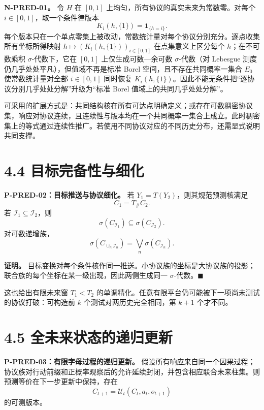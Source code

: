 \documentclass[
  11pt,
  oneside]{book}
\begin{document}
\textbf{N-PRED-01。} 令 \(H\) 在 \([0,1]\) 上均匀，所有协议的真实未来为常数零。对每个 \(i\in[0,1]\)，取一个条件律版本 \[K_i(h,\{1\})=\mathbf1_{\{h=i\}}.\] 每个版本只在一个单点零集上被改动，常数统计量对每个协议分别充分。逐点收集所有坐标所得映射 \(h\mapsto(K_i(h,\{1\}))_{i\in[0,1]}\) 在点集意义上区分每个 \(h\)；在不可数乘积 \(\sigma\)-代数下，它在 \([0,1]\) 上仅生成可数---余可数 \(\sigma\)-代数（对 Lebesgue 测度仍几乎处处平凡），但值域不再是标准 Borel 空间，且不存在共同概率一集合 \(E_0\) 使常数统计量对全部 \(i\in[0,1]\) 同时恢复 \(K_i(h,\{1\})\)。因此不能无条件把``逐协议分别几乎处处分解''升级为``标准 Borel 值域上的共同几乎处处分解''。

可采用的扩展方式是：共同结构核在所有可达点明确定义；或存在可数稠密协议集，响应对协议连续，且连续性与版本均在一个共同概率一集合上成立。此时稠密集上的等式通过连续性推广。若使用不同协议对应的不同历史分布，还需显式说明共同支撑。

\section{4.4 目标完备性与细化}\label{ux76eeux6807ux5b8cux5907ux6027ux4e0eux7ec6ux5316}

\hypertarget{p-pred-02}{}\label{p-pred-02}

\textbf{P-PRED-02：目标推送与协议细化。} 若 \(Y_1=T(Y_2)\)，则其规范预测核满足 \[C_1=T_\#C_2.\] 若 \(\mathcal I_1\subseteq\mathcal I_2\)，则 \[\sigma(C_{\mathcal I_1})\subseteq\sigma(C_{\mathcal I_2}).\] 对可数递增族， \[\sigma(C_{\cup_n\mathcal I_n})=\bigvee_n\sigma(C_{\mathcal I_n}).\]

\textbf{证明。} 目标变换对每个条件核作同一推送。小协议族的坐标是大协议族的投影；联合族的每个坐标在某一级出现，因此两侧生成同一 \(\sigma\)-代数。\(\blacksquare\)

这也给出有限未来窗 \(T_1<T_2\) 的单调精化。任意有限平台仍可能被下一项尚未测试的协议打破：可构造前 \(k\) 个测试对两历史完全相同，第 \(k+1\) 个才不同。

\section{4.5 全未来状态的递归更新}\label{ux5168ux672aux6765ux72b6ux6001ux7684ux9012ux5f52ux66f4ux65b0}

\hypertarget{p-pred-03}{}\label{p-pred-03}

\textbf{P-PRED-03：有限字母过程的递归更新。} 假设所有响应来自同一个因果过程；协议族对行动前缀和正概率观察后的允许延续封闭，并包含相应联合未来柱集。则预测等价在下一步更新中保持，存在 \[C_{t+1}=\mathcal U_t(C_t,a_t,o_{t+1})\] 的可测版本。
\end{document}

